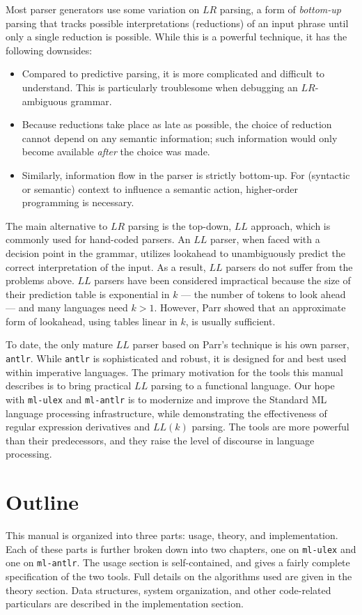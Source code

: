 Most parser generators use some variation on $LR$ parsing, a form of \emph{bottom-up} parsing that tracks possible interpretations (reductions) of an input phrase until only a single reduction is possible.  While this is a powerful technique, it has the following downsides:
\begin{itemize}
  \item Compared to predictive parsing, it is more complicated and difficult to understand.  This is particularly troublesome when debugging an $LR$-ambiguous grammar.
  \item Because reductions take place as late as possible, the choice of reduction cannot depend on any semantic information; such information would only become available \emph{after} the choice was made.
  \item Similarly, information flow in the parser is strictly bottom-up.  For (syntactic or semantic) context to influence a semantic action, higher-order programming is necessary.
\end{itemize} 
The main alternative to $LR$ parsing is the top-down, $LL$ approach, which is commonly used for hand-coded parsers.  An $LL$ parser, when faced with a decision point in the grammar, utilizes lookahead to unambiguously predict the correct interpretation of the input.  As a result, $LL$ parsers do not suffer from the problems above.  $LL$ parsers have been considered impractical because the size of their prediction table is exponential in $k$ --- the number of tokens to look ahead --- and many languages need $k > 1$.  However, Parr showed that an approximate form of lookahead, using tables linear in $k$, is usually sufficient.

To date, the only mature $LL$ parser based on Parr's technique is his own parser, {\tt antlr}.  While {\tt antlr} is sophisticated and robust, it is designed for and best used within imperative languages.  The primary motivation for the tools this manual describes is to bring practical $LL$ parsing to a functional language.
Our hope with {\tt ml-ulex} and {\tt ml-antlr} is to modernize and improve the Standard ML language processing infrastructure, while demonstrating the effectiveness of regular expression derivatives and $LL(k)$ parsing.  The tools are more powerful than their predecessors, and they raise the level of discourse in language processing.  

\section{Outline}

This manual is organized into three parts: usage, theory, and implementation.  Each of these parts is further broken down into two chapters, one on {\tt ml-ulex} and one on {\tt ml-antlr}.  The usage section is self-contained, and gives a fairly complete specification of the two tools.  Full details on the algorithms used are given in the theory section.  Data structures, system organization, and other code-related particulars are described in the implementation section.